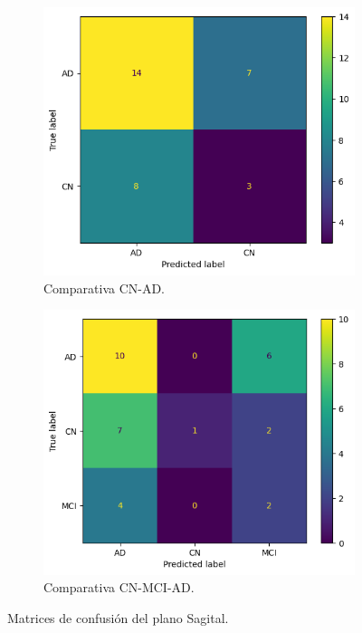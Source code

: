 \begin{figure}[H]
    \centering
    \begin{subfigure}{0.45\textwidth}
        \includegraphics[width=\textwidth]{./imgs/resultados/sagittal/CN_AD_cm_SAGITTAL}
        \caption{Comparativa CN-AD. }
        \label{fig:mc-sagital-cn-ad}
    \end{subfigure}
    \hspace*{\fill}
    \begin{subfigure}{0.45\textwidth}
        \includegraphics[width=\textwidth]{./imgs/resultados/sagittal/CN_MCI_AD_cm_SAGITTAL}
        \caption{Comparativa CN-MCI-AD. }
        \label{fig:mc-sagital-cn-mci-ad}
    \end{subfigure}
    \caption{Matrices de confusión del plano Sagital.} \label{fig:mc-sagittal}
\end{figure}

